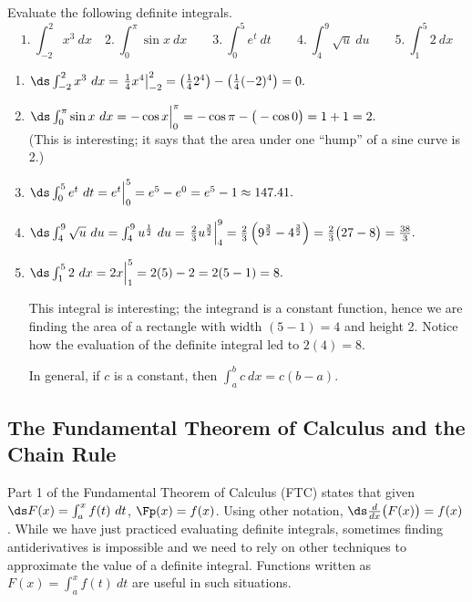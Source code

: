 \begin{example}\label{ex_ftc4}
Evaluate the following definite integrals.
\[
1.\ \int_{-2}^2 x^3\ dx \quad 2.\ \int_0^\pi \sin x\ dx \qquad
3.\ \int_0^5 e^t\ dt \qquad 4.\ \int_4^9 \sqrt{u}\ du\qquad 5.\ \int_1^5 2\ dx
\]
\vspace{-10pt}
\solution
\begin{enumerate}
\item	$\ds \int_{-2}^2 x^3\ dx = \left.\frac14x^4\right|_{-2}^2 = \left(\frac142^4\right) - \left(\frac14(-2)^4\right) = 0.$
\item	$\ds \int_0^\pi \sin x\ dx = -\cos x\Big|_0^\pi = -\cos \pi- \big(-\cos 0\big) = 1+1=2.$ \\
(This is interesting; it says that the area under one ``hump'' of a sine curve is 2.)
\item	$\ds \int_0^5e^t\ dt = e^t\Big|_0^5 = e^5 - e^0 = e^5-1 \approx 147.41.$
\item	$\ds \int_4^9 \sqrt{u}\ du = \int_4^9 u^\frac12\ du = \left.\frac23u^\frac32\right|_4^9 = \frac23\left(9^\frac32-4^\frac32\right) = \frac23\big(27-8\big) =\frac{38}3.$
\item	$\ds \int_1^5 2\ dx = 2x\Big|_1^5 = 2(5)-2=2(5-1)=8.$ 

This integral is interesting; the integrand is a constant function, hence we are finding the area of a rectangle with width $(5-1)=4$ and height 2. Notice how the evaluation of the definite integral led to $2(4)=8$. 

In general, if $c$ is a constant, then $\int_a^b c\ dx = c(b-a)$.
\end{enumerate}
\end{example}

\subsection{The Fundamental Theorem of Calculus and the Chain Rule}

Part 1 of the Fundamental Theorem of Calculus (FTC) states that given $\ds F(x) = \int_a^x f(t)\ dt$,  $\Fp(x) = f(x)$. Using other notation, $\ds \frac{d}{dx}\big(F(x)\big) = f(x)$. While we have just practiced evaluating definite integrals, sometimes finding antiderivatives is impossible and we need to rely on other techniques to approximate the value of a definite integral. Functions written as $F(x) = \int_a^x f(t)\ dt$ are useful in such situations.

